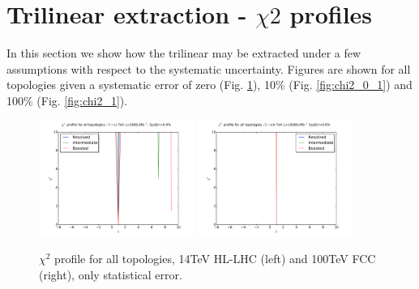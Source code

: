 \documentclass[11pt]{article}
\begin{document}
\newpage
\section{Trilinear extraction - $\chi2$ profiles}

In this section we show how the trilinear may be extracted under a few assumptions with respect to the systematic uncertainty. Figures are shown for all topologies given a systematic error of zero (Fig. \ref{fig:chi2_0}), 10\% (Fig. \ref{fig:chi2_0_1}) and 100\% (Fig. \ref{fig:chi2_1}).

\begin{figure}[htbp]
\begin{center}
\includegraphics[width=0.45\textwidth]{plots/chi2_14TeV_sys0_0.pdf}
\includegraphics[width=0.45\textwidth]{plots/chi2_100TeV_sys0_0.pdf}
\caption{$\chi^2$ profile for all topologies, 14TeV HL-LHC (left) and 100TeV FCC (right), only statistical error.}
\label{fig:chi2_0}
\end{center}
\end{figure}
\end{document}
